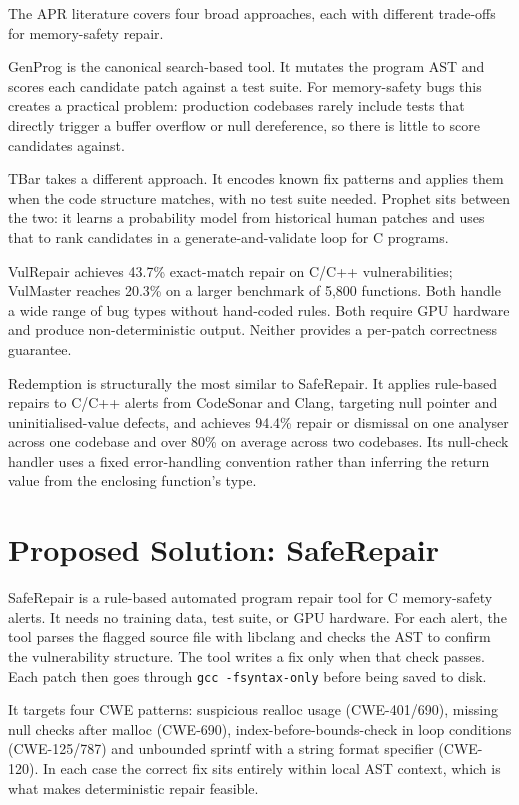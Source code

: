 The APR literature covers four broad approaches, each with different trade-offs for memory-safety repair.

GenProg \cite{b8} is the canonical search-based tool. It mutates the program AST and scores each candidate patch against a test suite. For memory-safety bugs this creates a practical problem: production codebases rarely include tests that directly trigger a buffer overflow or null dereference, so there is little to score candidates against.

TBar \cite{b10} takes a different approach. It encodes known fix patterns and applies them when the code structure matches, with no test suite needed. Prophet \cite{b11} sits between the two: it learns a probability model from historical human patches and uses that to rank candidates in a generate-and-validate loop for C programs.

VulRepair \cite{b4} achieves 43.7\% exact-match repair on C/C++ vulnerabilities; VulMaster \cite{b3} reaches 20.3\% on a larger benchmark of 5,800 functions. Both handle a wide range of bug types without hand-coded rules. Both require GPU hardware and produce non-deterministic output. Neither provides a per-patch correctness guarantee.

Redemption \cite{b2} is structurally the most similar to SafeRepair. It applies rule-based repairs to C/C++ alerts from CodeSonar and Clang, targeting null pointer and uninitialised-value defects, and achieves 94.4\% repair or dismissal on one analyser across one codebase and over 80\% on average across two codebases. Its null-check handler uses a fixed error-handling convention rather than inferring the return value from the enclosing function's type.

\section{Proposed Solution: SafeRepair}

SafeRepair is a rule-based automated program repair tool for C memory-safety alerts. It needs no training data, test suite, or GPU hardware. For each alert, the tool parses the flagged source file with libclang and checks the AST to confirm the vulnerability structure. The tool writes a fix only when that check passes. Each patch then goes through \texttt{gcc -fsyntax-only} before being saved to disk.

It targets four CWE patterns: suspicious realloc usage (CWE-401/690), missing null checks after malloc (CWE-690), index-before-bounds-check in loop conditions (CWE-125/787) and unbounded sprintf with a string format specifier (CWE-120). In each case the correct fix sits entirely within local AST context, which is what makes deterministic repair feasible.

